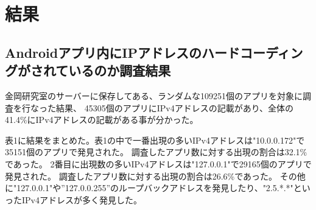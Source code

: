 \documentclass[a4j]{jarticle}
\begin{document}
\newpage
\section{結果}
\subsection{Androidアプリ内にIPアドレスのハードコーディングがされているのか調査結果}
金岡研究室のサーバーに保存してある、ランダムな109251個のアプリを対象に調査を行なった結果、
45305個のアプリにIPv4アドレスの記載があり、全体の41.4\%にIPv4アドレスの記載がある事が分かった。

表1に結果をまとめた。表1の中で一番出現の多いIPv4アドレスは"10.0.0.172"で35151個のアプリで発見された。
調査したアプリ数に対する出現の割合は32.1\%であった。
2番目に出現数の多いIPv4アドレスは"127.0.0.1"で29165個のアプリで発見された。
調査したアプリ数に対する出現の割合は26.6\%であった。
その他に"127.0.0.1"や”127.0.0.255”のループバックアドレスを発見したり、"2.5.*.*"といったIPv4アドレスが多く発見した。
\end{document}
